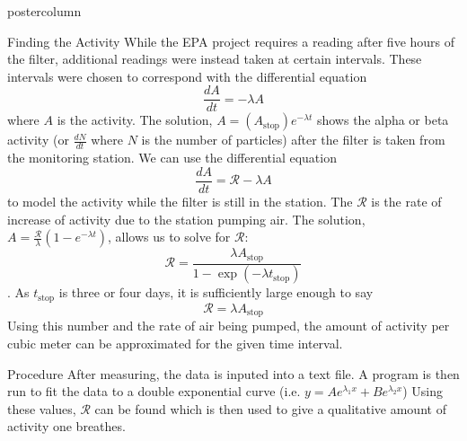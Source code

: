 \documentclass[final,11pt]{beamer}
\renewcommand{\d}[2]{\frac{d #1}{d #2}}
\newlength{\columnheight}
\begin{document}
\begin{frame}
\begin{columns}
		\begin{column}{.39\textwidth}
			\begin{beamercolorbox}[center,wd=\textwidth]{postercolumn}
				\begin{minipage}[T]{.95\textwidth}
					\parbox[t][\columnheight]{\textwidth}{
						\begin{block}{Finding the Activity}
					\small	While the EPA project requires a reading after five hours of the filter, additional readings were instead taken at certain intervals. These intervals were chosen to correspond with the differential equation \[\d{A}{t} = -\lambda A\] where $A$ is the activity. The solution, $A = \left(A_{\text{stop}}\right)e^{-\lambda t}$ shows the alpha or beta activity (or $\d{N}{t}$ where $N$ is the number of particles) after the filter is taken from the monitoring station. We can use the differential equation \[\d{A}{t} = \mathcal{R} - \lambda A\] to model the activity while the filter is still in the station. The $\mathcal{R}$ is the rate of increase of activity due to the station pumping air. The solution, $A = \frac{\mathcal{R}}{\lambda}\left(1-e^{-\lambda t}\right)$, allows us to solve for $\mathcal{R}$: \[\mathcal{R} = \frac{\lambda A_{\text{stop}}}{1-\exp(-\lambda t_{\text{stop}})}\]. As $t_{\text{stop}}$ is three or four days, it is sufficiently large enough to say \[\mathcal{R} = \lambda A_{\text{stop}}\] Using this number and the rate of air being pumped, the amount of activity per cubic meter can be approximated for the given time interval.
						\end{block}
						\begin{block}{Procedure}
						\small After measuring, the data is inputed into a text file. A program is then run to fit the data to a double exponential curve (i.e. $y = Ae^{\lambda_1 x} + Be^{\lambda_2 x}$) Using these values, $\mathcal{R}$ can be found which is then used to give a qualitative amount of activity one breathes.
						\end{block}
					}
				\end{minipage}
			\end{beamercolorbox}
		\end{column}


\end{columns}
\end{frame}
\end{document}
